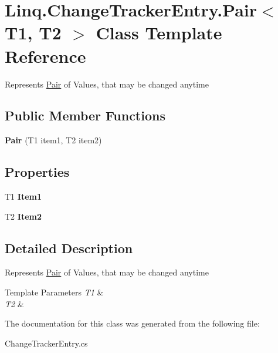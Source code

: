 \hypertarget{class_linq_1_1_change_tracker_entry_1_1_pair}{}\section{Linq.\+Change\+Tracker\+Entry.\+Pair$<$ T1, T2 $>$ Class Template Reference}
\label{class_linq_1_1_change_tracker_entry_1_1_pair}


Represents \mbox{\hyperlink{class_linq_1_1_change_tracker_entry_1_1_pair}{Pair}} of Values, that may be changed anytime  


\subsection*{Public Member Functions}
\begin{DoxyCompactItemize}
\item 
\mbox{\label{class_linq_1_1_change_tracker_entry_1_1_pair_a725821fc6095b8718a129e21cf3abf56}} 
{\bfseries Pair} (T1 item1, T2 item2)
\end{DoxyCompactItemize}
\subsection*{Properties}
\begin{DoxyCompactItemize}
\item 
\mbox{\label{class_linq_1_1_change_tracker_entry_1_1_pair_a1ea9ce35a37cdf56f953aac814d1a805}} 
T1 {\bfseries Item1}
\item 
\mbox{\label{class_linq_1_1_change_tracker_entry_1_1_pair_a44b727ccb8fef8d0c26aa2f668974726}} 
T2 {\bfseries Item2}
\end{DoxyCompactItemize}


\subsection{Detailed Description}
Represents \mbox{\hyperlink{class_linq_1_1_change_tracker_entry_1_1_pair}{Pair}} of Values, that may be changed anytime 


\begin{DoxyTemplParams}{Template Parameters}
{\em T1} & \\
\hline
{\em T2} & \\
\hline
\end{DoxyTemplParams}


The documentation for this class was generated from the following file\+:\begin{DoxyCompactItemize}
\item 
Change\+Tracker\+Entry.\+cs\end{DoxyCompactItemize}
